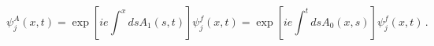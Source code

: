 \begin{equation}
\psi _{j}^{A}(x,t)=\exp \left[ ie\int^{x}dsA_{1}(s,t)\right] \psi
_{j}^{f}(x,t)=\exp \left[ ie\int^{t}dsA_{0}(x,s)\right] \psi _{j}^{f}(x,t)\,.
\label{lo2}
\end{equation}

